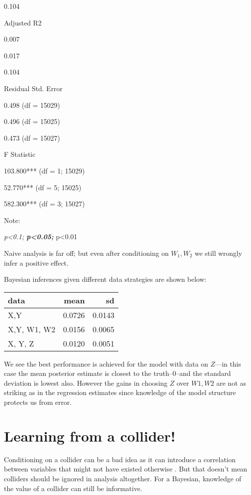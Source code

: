 \documentclass[
  12pt,
]{book}
\begin{document}
0.104

Adjusted R2

0.007

0.017

0.104

Residual Std. Error

0.498 (df = 15029)

0.496 (df = 15025)

0.473 (df = 15027)

F Statistic

103.800*** (df = 1; 15029)

52.770*** (df = 5; 15025)

582.300*** (df = 3; 15027)

Note:

\emph{p\textless0.1; \textbf{p\textless0.05; }}p\textless0.01

Naive analysis is far off; but even after conditioning on \(W_1, W_2\) we still wrongly infer a positive effect.

Bayesian inferences given different data strategies are shown below:

\begin{tabular}{l|r|r}
\hline
data & mean & sd\\
\hline
X,Y & 0.0726 & 0.0143\\
\hline
X,Y, W1, W2 & 0.0156 & 0.0065\\
\hline
X, Y, Z & 0.0120 & 0.0051\\
\hline
\end{tabular}

We see the best performance is achieved for the model with data on \(Z\)---in this case the mean posterior estimate is closest to the truth--0--and the standard deviation is lowest also. However the gains in choosing \(Z\) over \(W1, W2\) are not as striking as in the regression estimates since knowledge of the model structure protects us from error.

\hypertarget{learning-from-a-collider}{%
\section{Learning from a collider!}\label{learning-from-a-collider}}

Conditioning on a collider can be a bad idea as it can introduce a correlation between variables that might not have existed otherwise \citep{elwert2014endogenous}. But that doesn't mean colliders should be ignored in analysis altogether. For a Bayesian, knowledge of the value of a collider can still be informative.
\end{document}
